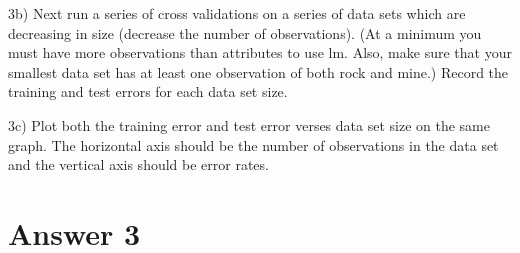 \documentclass{article}
\begin{document}
3b) Next run a series of cross validations on a series of data sets which are
decreasing in size (decrease the number of observations). (At a minimum you
must have more observations than attributes to use lm. Also, make sure that
your smallest data set has at least one observation of both rock and mine.)
Record the training and test errors for each data set size.

3c) Plot both the training error and test error verses data set size on the same
graph. The horizontal axis should be the number of observations in the data
set and the vertical axis should be error rates.

\section*{Answer  3}
\end{document}
